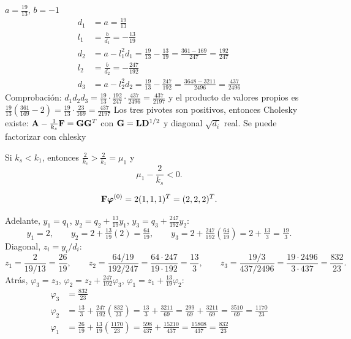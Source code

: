 $a = \frac{19}{13}$, $b = -1$
\begin{align*}
	d_1 &= a = \tfrac{19}{13}\\
	l_1 &= \tfrac{b}{d_1} = -\tfrac{13}{19}\\
	d_2 &= a - l_1^2 d_1 = \tfrac{19}{13} - \tfrac{13}{19} = \tfrac{361 - 169}{247} = \tfrac{192}{247}\\
	l_2 &= \tfrac{b}{d_2} = -\tfrac{247}{192}\\
	d_3 &= a - l_2^2 d_2 = \tfrac{19}{13} - \tfrac{247}{192} = \tfrac{3648 - 3211}{2496} = \tfrac{437}{2496}
\end{align*}
Comprobación: $d_1 d_2 d_3 = \frac{19}{13}\cdot\frac{192}{247}\cdot\frac{437}{2496} = \frac{437}{2197}$ y el producto de
valores propios es $\frac{19}{13}\left(\frac{361}{169} - 2\right) = \frac{19}{13}\cdot\frac{23}{169} = \frac{437}{2197}$
Los tres pivotes son positivos, entonces Cholesky existe: $\mathbf{A} - \frac{1}{k_s}\mathbf{F} = \mathbf{G}\mathbf{G}^T$ con
$\mathbf{G} = \mathbf{L}\mathbf{D}^{1/2}$ y diagonal $\sqrt{d_i}$ real.
Se puede factorizar con chlesky

Si $k_s < k_1$, entonces $\frac{2}{k_s} > \frac{2}{k_1} = \mu_1$ y
\[
\mu_1 - \frac{2}{k_s} < 0 .
\]


\[
\mathbf{F}\bm{\varphi}^{(0)} = 2(1, 1, 1)^T = (2, 2, 2)^T .
\]

Adelante, $y_1 = q_1$, $y_2 = q_2 + \frac{13}{19}y_1$, $y_3 = q_3 + \frac{247}{192}y_2$:
\[
y_1 = 2,\qquad
y_2 = 2 + \tfrac{13}{19}(2) = \tfrac{64}{19},\qquad
y_3 = 2 + \tfrac{247}{192}\left(\tfrac{64}{19}\right) = 2 + \tfrac{13}{3} = \tfrac{19}{3} .
\]
Diagonal, $z_i = y_i/d_i$:
\[
z_1 = \frac{2}{19/13} = \frac{26}{19},\qquad
z_2 = \frac{64/19}{192/247} = \frac{64\cdot 247}{19\cdot 192} = \frac{13}{3},\qquad
z_3 = \frac{19/3}{437/2496} = \frac{19\cdot 2496}{3\cdot 437} = \frac{832}{23} .
\]
Atrás, $\varphi_3 = z_3$, $\varphi_2 = z_2 + \frac{247}{192}\varphi_3$, $\varphi_1 = z_1 + \frac{13}{19}\varphi_2$:
\begin{align*}
	\varphi_3 &= \tfrac{832}{23}\\
	\varphi_2 &= \tfrac{13}{3} + \tfrac{247}{192}\left(\tfrac{832}{23}\right) = \tfrac{13}{3} + \tfrac{3211}{69}
	= \tfrac{299}{69} + \tfrac{3211}{69} = \tfrac{3510}{69} = \tfrac{1170}{23}\\
	\varphi_1 &= \tfrac{26}{19} + \tfrac{13}{19}\left(\tfrac{1170}{23}\right) = \tfrac{598}{437} + \tfrac{15210}{437}
	= \tfrac{15808}{437} = \tfrac{832}{23}
\end{align*}

